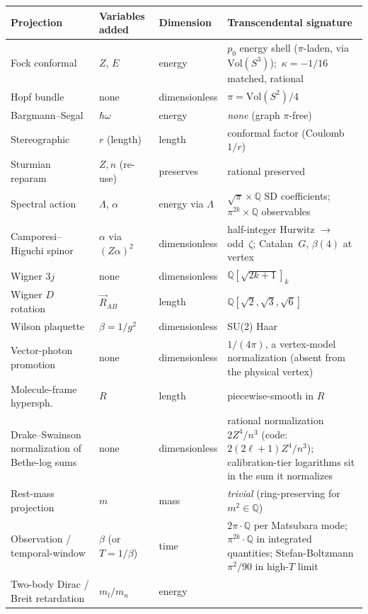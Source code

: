 \documentclass[11pt]{article}
\begin{document}
\begin{table}[h]
\centering\small
\begin{tabular}{p{3.5cm} p{3cm} p{2cm} p{4cm}}
\toprule
Projection & Variables added & Dimension & Transcendental signature \\
\midrule
Fock conformal & $Z$, $E$ & energy & $p_0$ energy shell ($\pi$-laden,
via $\mathrm{Vol}(S^3)$);\ $\kappa = -1/16$ matched, rational \\
Hopf bundle & none & dimensionless & $\pi = \mathrm{Vol}(S^2)/4$ \\
Bargmann--Segal & $\hbar\omega$ & energy & \textit{none} (graph
$\pi$-free) \\
Stereographic & $r$ (length) & length & conformal factor (Coulomb
$1/r$) \\
Sturmian reparam & $Z, n$ (re-use) & preserves & rational
preserved \\
Spectral action & $\Lambda$, $\alpha$ & energy via $\Lambda$ &
$\sqrt{\pi}\times \mathbb{Q}$ SD coefficients;
$\pi^{2k}\times \mathbb{Q}$ observables \\
Camporesi--Higuchi spinor & $\alpha$ via $(Z\alpha)^2$ &
dimensionless & half-integer Hurwitz $\to$ odd~$\zeta$;
Catalan~$G$, $\beta(4)$ at vertex \\
Wigner $3j$ & none & dimensionless &
$\mathbb{Q}[\sqrt{2k{+}1}]_k$ \\
Wigner $D$ rotation & $\vec{R}_{AB}$ & length &
$\mathbb{Q}[\sqrt{2}, \sqrt{3}, \sqrt{6}]$ \\
Wilson plaquette & $\beta = 1/g^2$ & dimensionless & SU(2) Haar \\
Vector-photon promotion & none & dimensionless & $1/(4\pi)$, a
vertex-model normalization (absent from the physical vertex) \\
Molecule-frame hypersph. & $R$ & length & piecewise-smooth in $R$ \\
Drake--Swainson normalization of Bethe-log sums & none & dimensionless &
rational normalization $2Z^4/n^3$ (code: $2(2\ell+1)Z^4/n^3$); calibration-tier
logarithms sit in the sum it normalizes \\
Rest-mass projection & $m$ & mass &
\textit{trivial} (ring-preserving for $m^2 \in \mathbb{Q}$) \\
Observation / temporal-window & $\beta$ (or $T = 1/\beta$) & time &
$2\pi \cdot \mathbb{Q}$ per Matsubara mode; $\pi^{2k}\cdot\mathbb{Q}$ in
integrated quantities; Stefan-Boltzmann $\pi^2/90$ in high-$T$ limit \\
Two-body Dirac / Breit retardation & $m_l/m_n$ & energy &

\end{tabular}
\end{table}
\end{document}

